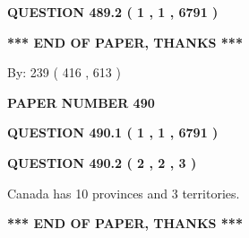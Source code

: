 \documentclass[12pt]{article}
\begin{document}
{\textbf{\Large{QUESTION
489.2 
 ( 1 , 1 , 6791 )
}}}
  
  
   
   
 \vspace{0.2in}
 
   
   
   
   
\vspace{1.0in} 
{\textbf{\large{ *** END OF PAPER, THANKS *** }}} 
   
   
\hspace{1.0in} By: 
 239 ( 416 ,  613 )
   
   
   
   
\newpage 
\setcounter{page}{ 
   490001 } 
   
   
   
   
 {\textbf{ \Large{ PAPER NUMBER  490  }}}
   
   
\vspace{0.2in}
   
   
   
   
   
   
 \vspace{0.2in}
 
 
 
 
   
   
  
\vspace{0.2in}
  
{\textbf{\Large{QUESTION
490.1 
 ( 1 , 1 , 6791 )
}}}
  
  
  
\vspace{0.2in}
  
{\textbf{\Large{QUESTION
490.2 
 ( 2 , 2 , 3 )
}}}
  
  
 
 
\noindent{}
 
 
Canada has 10  provinces and 3 territories.
 
 
 
 
   
   
 \vspace{0.2in}
 
   
   
   
   
\vspace{1.0in} 
{\textbf{\large{ *** END OF PAPER, THANKS *** }}} 
   
\end{document}

